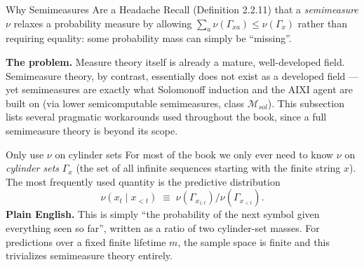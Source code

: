 \documentclass[aspectratio=169,10pt]{beamer}
\begin{document}
\begin{frame}{Why Semimeasures Are a Headache}
  Recall (Definition 2.2.11) that a \emph{semimeasure} $\nu$ relaxes a
  probability measure by allowing $\sum_{a} \nu(\Gamma_{xa}) \le \nu(\Gamma_x)$
  rather than requiring equality: some probability mass can simply be
  ``missing''.

  \textbf{The problem.} Measure theory itself is already a mature,
  well-developed field. Semimeasure theory, by contrast, essentially does
  not exist as a developed field --- yet semimeasures are exactly what
  Solomonoff induction and the AIXI agent are built on (via lower
  semicomputable semimeasures, class $\mathcal{M}_{sol}$). This subsection
  lists several pragmatic workarounds used throughout the book, since a full
  semimeasure theory is beyond its scope.

  \begin{block}{Only use $\nu$ on cylinder sets}
    For most of the book we only ever need to know $\nu$ on \emph{cylinder
    sets} $\Gamma_x$ (the set of all infinite sequences starting with the
    finite string $x$). The most frequently used quantity is the predictive
    distribution
    \[
      \nu(x_t \mid x_{<t}) \;\equiv\; \nu(\Gamma_{x_{1:t}}) / \nu(\Gamma_{x_{<t}}).
    \]
    \textbf{Plain English.} This is simply ``the probability of the next
    symbol given everything seen so far'', written as a ratio of two
    cylinder-set masses. For predictions over a fixed finite lifetime $m$,
    the sample space is finite and this trivializes semimeasure theory
    entirely.
  \end{block}
\end{frame}
\end{document}
